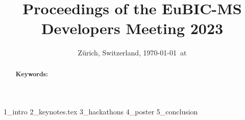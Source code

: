 \documentclass[11pt,a4paper,DIV21,abstracton,twocolumn]{scrartcl}
\title{Proceedings of the EuBIC-MS Developers Meeting 2023}
\author{
	
}
\date{{\small Zürich, Switzerland, \today\ at \currenttime}}
\begin{document}
\maketitle

\begin{abstract}
	
	\vspace{0.5cm}
	\textbf{Keywords:
	}
	
\end{abstract}


 {1_intro}
 {2_keynotes.tex}
 {3_hackathons}
 {4_poster}
 {5_conclusion}

%



\begin{table*}[ht]
\centering
\label{tab:affiliation}

\caption{Author affiliation; grouped and ordered by affiliation.}
\end{table*}
\end{document}
